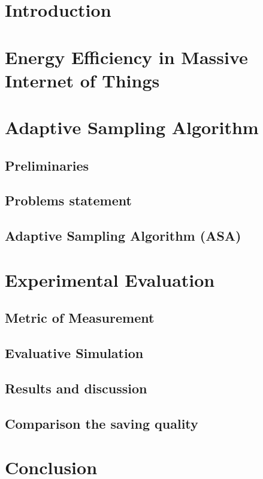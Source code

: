 \section{Introduction}
\section{Energy Efficiency in Massive Internet of Things}
\section{Adaptive Sampling Algorithm}
\subsection{Preliminaries}
\subsection{Problems statement}
\subsection{Adaptive Sampling Algorithm (ASA)}
\section{Experimental Evaluation}
\subsection{Metric of Measurement}
\subsection{Evaluative Simulation}
\subsection{Results and discussion}
\subsection{Comparison the saving quality}
\section{Conclusion}
